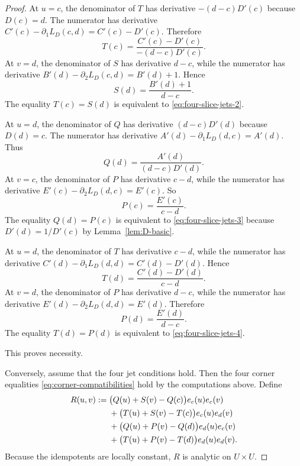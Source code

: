 \documentclass[11pt]{amsart}
\numberwithin{equation}{section}
\theoremstyle{remark}
\theoremstyle{definition}
\begin{document}
\begin{proof}
At $u=c$, the denominator of $T$ has derivative $-(d-c)D'(c)$ because $D(c)=d$. The numerator has derivative $C'(c)-\partial_1L_D(c,d)=C'(c)-D'(c)$. Therefore
\begin{equation}\label{eq:Tccalc}
T(c)=\frac{C'(c)-D'(c)}{-(d-c)D'(c)}.
\end{equation}
At $v=d$, the denominator of $S$ has derivative $d-c$, while the numerator has derivative $B'(d)-\partial_2L_D(c,d)=B'(d)+1$. Hence
\begin{equation}\label{eq:Sdcalc}
S(d)=\frac{B'(d)+1}{d-c}.
\end{equation}
The equality $T(c)=S(d)$ is equivalent to \eqref{eq:four-slice-jets-2}.

At $u=d$, the denominator of $Q$ has derivative $(d-c)D'(d)$ because $D(d)=c$. The numerator has derivative $A'(d)-\partial_1L_D(d,c)=A'(d)$. Thus
\begin{equation}\label{eq:Qdcalc}
Q(d)=\frac{A'(d)}{(d-c)D'(d)}.
\end{equation}
At $v=c$, the denominator of $P$ has derivative $c-d$, while the numerator has derivative $E'(c)-\partial_2L_D(d,c)=E'(c)$. So
\begin{equation}\label{eq:Pccalc}
P(c)=\frac{E'(c)}{c-d}.
\end{equation}
The equality $Q(d)=P(c)$ is equivalent to \eqref{eq:four-slice-jets-3} because $D'(d)=1/D'(c)$ by Lemma~\ref{lem:D-basic}.

At $u=d$, the denominator of $T$ has derivative $c-d$, while the numerator has derivative $C'(d)-\partial_1L_D(d,d)=C'(d)-D'(d)$. Hence
\begin{equation}\label{eq:Tdcalc}
T(d)=\frac{C'(d)-D'(d)}{c-d}.
\end{equation}
At $v=d$, the denominator of $P$ has derivative $d-c$, while the numerator has derivative $E'(d)-\partial_2L_D(d,d)=E'(d)$. Therefore
\begin{equation}\label{eq:Pdcalc}
P(d)=\frac{E'(d)}{d-c}.
\end{equation}
The equality $T(d)=P(d)$ is equivalent to \eqref{eq:four-slice-jets-4}.

This proves necessity.

Conversely, assume that the four jet conditions hold. Then the four corner equalities \eqref{eq:corner-compatibilities} hold by the computations above. Define
\begin{align}
R(u,v):={}&\bigl(Q(u)+S(v)-Q(c)\bigr)e_c(u)e_c(v) \notag\\
&+\bigl(T(u)+S(v)-T(c)\bigr)e_c(u)e_d(v) \notag\\
&+\bigl(Q(u)+P(v)-Q(d)\bigr)e_d(u)e_c(v) \notag\\
&+\bigl(T(u)+P(v)-T(d)\bigr)e_d(u)e_d(v). \label{eq:R-four-slice}
\end{align}
Because the idempotents are locally constant, $R$ is analytic on $U\times U$.


\end{proof}
\end{document}

